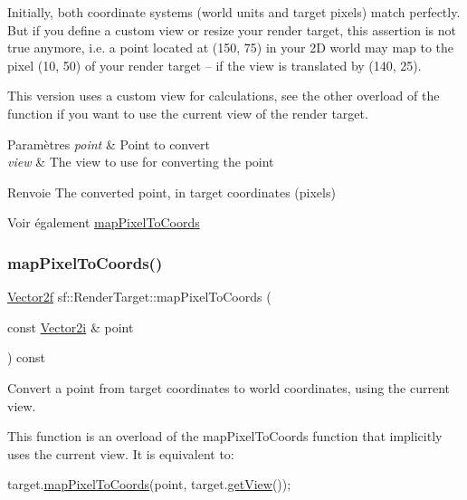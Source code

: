 Initially, both coordinate systems (world units and target pixels) match perfectly. But if you define a custom view or resize your render target, this assertion is not true anymore, i.\+e. a point located at (150, 75) in your 2D world may map to the pixel (10, 50) of your render target -- if the view is translated by (140, 25).

This version uses a custom view for calculations, see the other overload of the function if you want to use the current view of the render target.


\begin{DoxyParams}{Paramètres}
{\em point} & Point to convert \\
\hline
{\em view} & The view to use for converting the point\\
\hline
\end{DoxyParams}
\begin{DoxyReturn}{Renvoie}
The converted point, in target coordinates (pixels)
\end{DoxyReturn}
\begin{DoxySeeAlso}{Voir également}
\hyperlink{classsf_1_1RenderTarget_a0103ebebafa43a97e6e6414f8560d5e3}{map\+Pixel\+To\+Coords} 
\end{DoxySeeAlso}
\mbox{\label{classsf_1_1RenderTarget_a0103ebebafa43a97e6e6414f8560d5e3}} 
\subsubsection{\texorpdfstring{map\+Pixel\+To\+Coords()}{mapPixelToCoords()}\hspace{0.1cm}{\footnotesize\ttfamily [1/2]}}
{\footnotesize\ttfamily \hyperlink{classsf_1_1Vector2}{Vector2f} sf\+::\+Render\+Target\+::map\+Pixel\+To\+Coords (\begin{DoxyParamCaption}\item[{const \hyperlink{classsf_1_1Vector2}{Vector2i} \&}]{point }\end{DoxyParamCaption}) const}



Convert a point from target coordinates to world coordinates, using the current view. 

This function is an overload of the map\+Pixel\+To\+Coords function that implicitly uses the current view. It is equivalent to\+: 
\begin{DoxyCode}
target.\hyperlink{classsf_1_1RenderTarget_a0103ebebafa43a97e6e6414f8560d5e3}{mapPixelToCoords}(point, target.\hyperlink{classsf_1_1RenderTarget_a2c179503b4dcdf5282ef6426d317602c}{getView}());
\end{DoxyCode}



